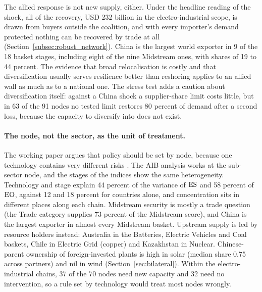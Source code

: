 The allied response is not new supply, either. Under the headline reading of the shock, all of the
recovery, USD 232 billion in the electro-industrial scope, is drawn from buyers outside the coalition,
and with every importer's demand protected nothing can be recovered by trade at all
(Section~\ref{subsec:robust_network}). China is the largest world exporter in 9 of the 18 basket
stages, including eight of the nine Midstream ones, with shares of 19 to 44 percent. The evidence that
broad relocalisation is costly and that diversification usually serves resilience better than
reshoring \citep{oecd2025supply,thakurweigold2024promoting,aiyar2023geoeconomic} applies to an allied
wall as much as to a national one. The stress test adds a caution about diversification itself:
against a China shock a supplier-share limit costs little, but in 63 of the 91 nodes no tested limit
restores 80 percent of demand after a second loss, because the capacity to diversify into does not
exist.

\paragraph{The node, not the sector, as the unit of treatment.} The working paper argues that
policy should be set by node, because one technology contains very different risks
\citep{neis2026allied}. The AIB analysis works at the sub-sector node, and the stages of the indices
show the same heterogeneity. Technology and stage explain 44 percent of the variance of $\mathrm{ES}$ and 58
percent of $\mathrm{EO}$, against 12 and 18 percent for countries alone, and concentration sits in different
places along each chain. Midstream security is mostly a trade question (the Trade category supplies 73
percent of the Midstream score), and China is the largest exporter in almost every Midstream basket.
Upstream supply is led by resource holders instead: Australia in the Batteries, Electric Vehicles and
Coal baskets, Chile in Electric Grid (copper) and Kazakhstan in Nuclear. Chinese-parent ownership of
foreign-invested plants is high in solar (median share 0.75 across partners) and nil in wind
(Section~\ref{sec:bilateral}). Within the electro-industrial chains, 37 of the 70 nodes need new
capacity and 32 need no intervention, so a rule set by technology would treat most nodes wrongly.

